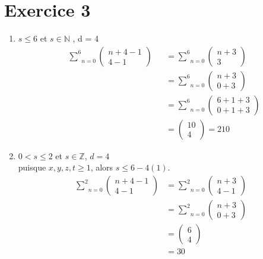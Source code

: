 \documentclass[fontsize=10pt]{article}
\begin{document}
\section*{Exercice 3}
\begin{enumerate}
\item $s \leq 6 $ et $s \in \mathbb{N}$ \hspace{0.5cm}, \hspace{0.5cm} d = 4
\begin{align*}
&\underset{n=0}{\overset{6}{\sum}}\begin{pmatrix}
n + 4 -1\\
4-1
\end{pmatrix} &&=
\underset{n=0}{\overset{6}{\sum}}\begin{pmatrix}
n + 3\\
3
\end{pmatrix}\\
&&&=
\underset{n=0}{\overset{6}{\sum}}\begin{pmatrix}
n + 3\\
0+3
\end{pmatrix}\\
&&&=\underset{n=0}{\overset{6}{\sum}}\begin{pmatrix}
6+1+3\\
0+1+3
\end{pmatrix}\\&&&= \begin{pmatrix} 10 \\ 4\end{pmatrix} = 210
\end{align*}
\item$ 0 < s \leq 2$ et $s \in \mathbb{Z}$, $d=4$\\
puisque $x,y,z,t \geq 1$, alors $s \leq 6 - 4(1)$.
\begin{align*}
\underset{n=0}{\overset{2}{\sum}}
\begin{pmatrix}
n+4-1\\
4-1
\end{pmatrix} &=\underset{n=0}{\overset{2}{\sum}}
\begin{pmatrix}
n+3\\
4-1
\end{pmatrix}\\
&=\underset{n=0}{\overset{2}{\sum}}
\begin{pmatrix}
n+3\\
0+3
\end{pmatrix}\\
&=
\begin{pmatrix}
6\\
4
\end{pmatrix}\\
&=30
\end{align*}


\end{enumerate}
\end{document}
